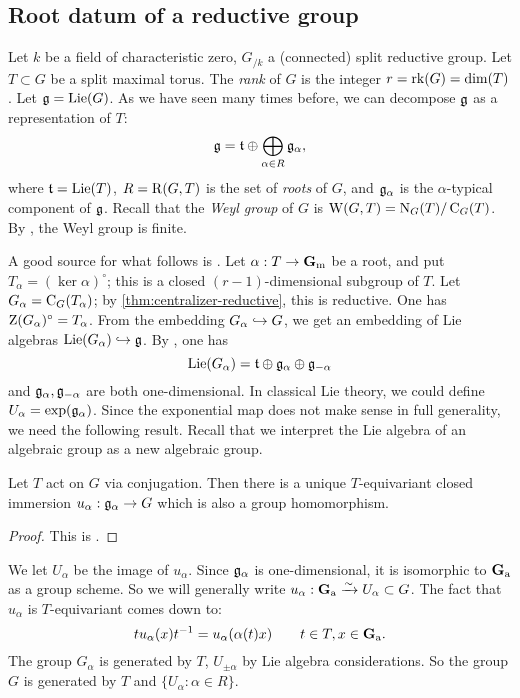 \subsection{Root datum of a reductive group}

Let $k$ be a field of characteristic zero, $G_{/k}$ a (connected) split 
reductive group. Let $T\subset G$ be a split maximal torus. The \emph{rank} of 
$G$ is the integer $r=\operatorname{rk}(G)=\dim(T)$. Let $\mathfrak{g}=\operatorname{Lie}(G)$. As we have seen 
many times before, we can decompose $\mathfrak{g}$ as a representation of $T$: 
\[
  \mathfrak{g}=\mathfrak{t}\oplus \bigoplus_{\alpha\in R} \mathfrak{g}_\alpha ,
\]
where $\mathfrak{t}=\operatorname{Lie}(T)$, $R=\operatorname{R}(G,T)$ is the set of \emph{roots} of $G$, and 
$\mathfrak{g}_\alpha$ is the $\alpha$-typical component of $\mathfrak{g}$. Recall that the 
\emph{Weyl group} of $G$ is $\operatorname{W}(G,T)=\operatorname{N}_G(T)/\operatorname{C}_G(T)$. By 
\cite[XII 2.1]{sga3-ii}, the Weyl group is finite. 

A good source for what follows is \cite[II.1]{jantzen-2003}. Let 
$\alpha:T\to \mathbf{G}_\mathrm{m}$ be a root, and put $T_\alpha=(\ker\alpha)^\circ$; this is a 
closed $(r-1)$-dimensional subgroup of $T$. Let 
$G_\alpha=\operatorname{C}_G(T_\alpha)$; by \autoref{thm:centralizer-reductive}, 
this is reductive. One has $\operatorname{Z}(G_\alpha)^\circ=T_\alpha$. From the 
embedding $G_\alpha\hookrightarrow G$, we get an embedding of Lie algebras 
$\operatorname{Lie}(G_\alpha)\hookrightarrow \mathfrak{g}$. By \cite[IX 3.5]{sga3-iii}, one has 
\[
  \operatorname{Lie}(G_\alpha) = \mathfrak{t}\oplus \mathfrak{g}_\alpha \oplus \mathfrak{g}_{-\alpha} 
\]
and $\mathfrak{g}_\alpha,\mathfrak{g}_{-\alpha}$ are both one-dimensional. In classical Lie 
theory, we could define $U_\alpha=\exp(\mathfrak{g}_\alpha)$. Since the exponential map 
does not make sense in full generality, we need the following result. Recall 
that we interpret the Lie algebra of an algebraic group as a new algebraic 
group. 

\begin{theorem}
Let $T$ act on $G$ via conjugation. Then there is a unique $T$-equivariant 
closed immersion $u_\alpha:\mathfrak{g}_\alpha\to G$ which is also a group 
homomorphism. 
\end{theorem}
\begin{proof}
This is \cite[XXII 1.1.i]{sga3-iii}. 
\end{proof}

We let $U_\alpha$ be the image of $u_\alpha$. Since $\mathfrak{g}_\alpha$ is 
one-dimensional, it is isomorphic to $\mathbf{G}_\mathrm{a}$ as a group scheme. So we will 
generally write $u_\alpha:\mathbf{G}_\mathrm{a}\xrightarrow\sim U_\alpha\subset G$. The fact that 
$u_\alpha$ is $T$-equivariant comes down to: 
\[
  t u_\alpha(x) t^{-1} = u_\alpha(\alpha(t) x) \qquad t\in T, x\in \mathbf{G}_\mathrm{a} .
\]
The group $G_\alpha$ is generated by $T$, $U_{\pm\alpha}$ by Lie 
algebra considerations. So the group $G$ is generated by $T$ and 
$\{U_\alpha:\alpha\in R\}$. 


